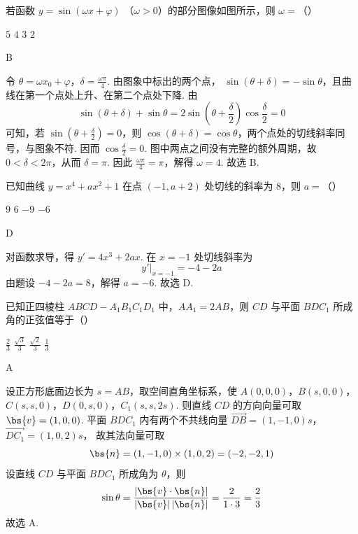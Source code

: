 \begin{problem}
若函数 \( y = \sin (\omega x + \varphi)  \) （\(\omega > 0\)）的部分图像如图所示，则 \( \omega = \)（\quad）


\choices
    {\(5\)}
    {\(4\)}
    {\(3\)}
    {\(2\)}

\begin{answer}
B
\end{answer}

\begin{solution}
令 \(\theta=\omega x_0+\varphi\)，\(\delta=\frac{\omega\pi}{4}\). 由图象中标出的两个点，
\(\sin(\theta+\delta)=-\sin\theta\)，且曲线在第一个点处上升、在第二个点处下降. 由
\[
\sin(\theta+\delta)+\sin\theta
=2\sin\left(\theta+\frac{\delta}{2}\right)\cos\frac{\delta}{2}=0
\]
可知，若 \(\sin\left(\theta+\frac{\delta}{2}\right)=0\)，则
\(\cos(\theta+\delta)=\cos\theta\)，两个点处的切线斜率同号，与图象不符. 因而
\(\cos\frac{\delta}{2}=0\). 图中两点之间没有完整的额外周期，故 \(0<\delta<2\pi\)，从而 \(\delta=\pi\).
因此 \(\frac{\omega\pi}{4}=\pi\)，解得 \(\omega=4\). 故选 B.
\end{solution}
\end{problem}

\begin{problem}
已知曲线 \( y = x^4 + ax^2 + 1 \) 在点 \((-1, a + 2)\) 处切线的斜率为 8，则 \( a = \)（\quad）

\choices
    {\(9\)}
    {\(6\)}
    {\(-9\)}
    {\(-6\)}

\begin{answer}
D
\end{answer}

\begin{solution}
对函数求导，得 \(y'=4x^3+2ax\). 在 \(x=-1\) 处切线斜率为
\[
y'\big|_{x=-1}=-4-2a
\]
由题设 \(-4-2a=8\)，解得 \(a=-6\). 故选 D.
\end{solution}
\end{problem}

\begin{problem}
已知正四棱柱 \(ABCD - A_{1}B_{1}C_{1}D_{1}\) 中，\(AA_{1} = 2AB\)，则 \(CD\) 与平面 \(BDC_{1}\) 所成角的正弦值等于（\quad）

\choices
    {\(\frac{2}{3}\)}
    {\(\frac{\sqrt{3}}{3}\)}
    {\(\frac{\sqrt{2}}{3}\)}
    {\(\frac{1}{3}\)}

\begin{answer}
A
\end{answer}

\begin{solution}
设正方形底面边长为 \(s=AB\)，取空间直角坐标系，使
\(A(0,0,0)\)，\(B(s,0,0)\)，\(C(s,s,0)\)，\(D(0,s,0)\)，\(C_1(s,s,2s)\).
则直线 \(CD\) 的方向向量可取 \(\bs{v}=(1,0,0)\). 平面 \(BDC_1\) 内有两个不共线向量
\(\overrightarrow{DB}=(1,-1,0)s\)，\(\overrightarrow{DC_1}=(1,0,2)s\)，
故其法向量可取
\[
\bs{n}=(1,-1,0)\times(1,0,2)=(-2,-2,1)
\]
设直线 \(CD\) 与平面 \(BDC_1\) 所成角为 \(\theta\)，则
\[
\sin\theta=\frac{|\bs{v}\cdot\bs{n}|}{|\bs{v}|\,|\bs{n}|}
=\frac{2}{1\cdot3}=\frac{2}{3}
\]
故选 A.
\end{solution}
\end{problem}

